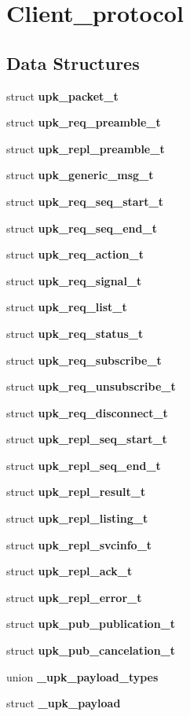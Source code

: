 \section{Client\_\-protocol}
\label{group__client__protocol}
\subsection*{Data Structures}
\begin{DoxyCompactItemize}
\item 
struct {\bf upk\_\-packet\_\-t}
\item 
struct {\bf upk\_\-req\_\-preamble\_\-t}
\item 
struct {\bf upk\_\-repl\_\-preamble\_\-t}
\item 
struct {\bf upk\_\-generic\_\-msg\_\-t}
\item 
struct {\bf upk\_\-req\_\-seq\_\-start\_\-t}
\item 
struct {\bf upk\_\-req\_\-seq\_\-end\_\-t}
\item 
struct {\bf upk\_\-req\_\-action\_\-t}
\item 
struct {\bf upk\_\-req\_\-signal\_\-t}
\item 
struct {\bf upk\_\-req\_\-list\_\-t}
\item 
struct {\bf upk\_\-req\_\-status\_\-t}
\item 
struct {\bf upk\_\-req\_\-subscribe\_\-t}
\item 
struct {\bf upk\_\-req\_\-unsubscribe\_\-t}
\item 
struct {\bf upk\_\-req\_\-disconnect\_\-t}
\item 
struct {\bf upk\_\-repl\_\-seq\_\-start\_\-t}
\item 
struct {\bf upk\_\-repl\_\-seq\_\-end\_\-t}
\item 
struct {\bf upk\_\-repl\_\-result\_\-t}
\item 
struct {\bf upk\_\-repl\_\-listing\_\-t}
\item 
struct {\bf upk\_\-repl\_\-svcinfo\_\-t}
\item 
struct {\bf upk\_\-repl\_\-ack\_\-t}
\item 
struct {\bf upk\_\-repl\_\-error\_\-t}
\item 
struct {\bf upk\_\-pub\_\-publication\_\-t}
\item 
struct {\bf upk\_\-pub\_\-cancelation\_\-t}
\item 
union {\bf \_\-upk\_\-payload\_\-types}
\item 
struct {\bf \_\-upk\_\-payload}
\end{DoxyCompactItemize}
